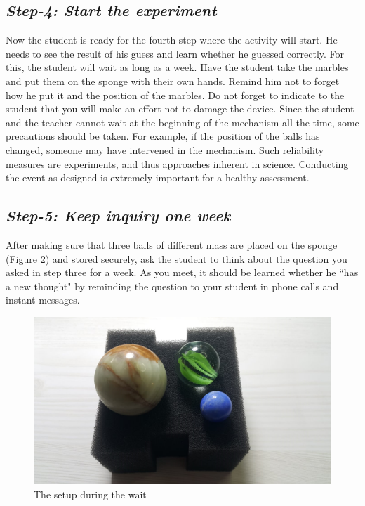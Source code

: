\documentclass[11.5pt]{sig-alternate}
\begin{document}
\begin{large}
\subsection*{\textit{Step-4: Start the experiment}}
Now the student is ready for the fourth step where the activity will start. He needs to see the result of his guess and learn whether he guessed correctly. For this, the student will wait as long as a week. Have the student take the marbles and put them on the sponge with their own hands. Remind him not to forget how he put it and the position of the marbles. Do not forget to indicate to the student that you will make an effort not to damage the device. Since the student and the teacher cannot wait at the beginning of the mechanism all the time, some precautions should be taken. For example, if the position of the balls has changed, someone may have intervened in the mechanism. Such reliability measures are experiments, and thus approaches inherent in science. Conducting the event as designed is extremely important for a healthy assessment.

\subsection*{\textit{Step-5: Keep inquiry one week}}
After making sure that three balls of different mass are placed on the sponge (Figure 2) and stored securely, ask the student to think about the question you asked in step three for a week. As you meet, it should be learned whether he ``has a new thought" by reminding the question to your student in phone calls and instant messages.

\begin{figure}[h]
    \centering
    \includegraphics [width=\columnwidth]{Figure2.png}
    \captionsetup{font=large, labelfont=bf}
    \caption{The setup during the wait}
\end{figure}


\end{large}
\end{document}
